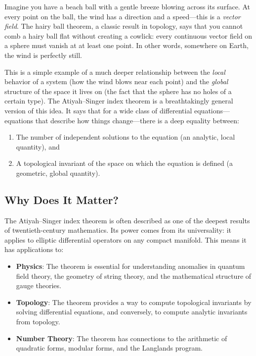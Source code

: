Imagine you have a beach ball with a gentle breeze blowing across its surface. At every point on the ball, the wind has a direction and a speed---this is a \emph{vector field}. The hairy ball theorem, a classic result in topology, says that you cannot comb a hairy ball flat without creating a cowlick: every continuous vector field on a sphere must vanish at at least one point. In other words, somewhere on Earth, the wind is perfectly still.

This is a simple example of a much deeper relationship between the \emph{local} behavior of a system (how the wind blows near each point) and the \emph{global} structure of the space it lives on (the fact that the sphere has no holes of a certain type). The Atiyah--Singer index theorem is a breathtakingly general version of this idea. It says that for a wide class of differential equations---equations that describe how things change---there is a deep equality between:

\begin{enumerate}
\item The number of independent solutions to the equation (an analytic, local quantity), and
\item A topological invariant of the space on which the equation is defined (a geometric, global quantity).
\end{enumerate}

\subsection{Why Does It Matter?}

The Atiyah--Singer index theorem is often described as one of the deepest results of twentieth-century mathematics. Its power comes from its universality: it applies to elliptic differential operators on any compact manifold. This means it has applications to:

\begin{itemize}
\item \textbf{Physics}: The theorem is essential for understanding anomalies in quantum field theory, the geometry of string theory, and the mathematical structure of gauge theories.

\item \textbf{Topology}: The theorem provides a way to compute topological invariants by solving differential equations, and conversely, to compute analytic invariants from topology.

\item \textbf{Number Theory}: The theorem has connections to the arithmetic of quadratic forms, modular forms, and the Langlands program.
\end{itemize}


